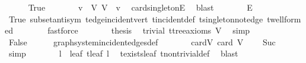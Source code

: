 \begin{isabellebody}
\ \ \ \ \isamarkupfalse%
\ True\isanewline
\ \ \ \ \isamarkupfalse%
\ \isamarkupfalse%
\ v\ \ V{\isacharcolon}{\kern0pt}\ {\isachardoublequoteopen}V\ {\isacharequal}{\kern0pt}\ {\isacharbraceleft}{\kern0pt}v{\isacharbraceright}{\kern0pt}{\isachardoublequoteclose}\ \isamarkupfalse%
\ card{\isacharunderscore}{\kern0pt}{}{\isacharunderscore}{\kern0pt}singletonE\ \isamarkupfalse%
\ blast\isanewline
\ \ \ \ \isamarkupfalse%
\ \isamarkupfalse%
\ {\isachardoublequoteopen}E\ {\isacharequal}{\kern0pt}\ {\isacharbraceleft}{\kern0pt}{\isacharbraceright}{\kern0pt}{\isachardoublequoteclose}\isanewline
\ \ \ \ \ \ \isamarkupfalse%
\ True\ subset{\isacharunderscore}{\kern0pt}antisym\ t{\isachardot}{\kern0pt}edge{\isacharunderscore}{\kern0pt}incident{\isacharunderscore}{\kern0pt}vert\ t{\isachardot}{\kern0pt}incident{\isacharunderscore}{\kern0pt}def\ t{\isachardot}{\kern0pt}singleton{\isacharunderscore}{\kern0pt}not{\isacharunderscore}{\kern0pt}edge\ t{\isachardot}{\kern0pt}wellformed\isanewline
\ \ \ \ \ \ \isamarkupfalse%
\ fastforce\isanewline
\ \ \ \ \isamarkupfalse%
\ \isamarkupfalse%
\ {\isacharquery}{\kern0pt}thesis\ \isamarkupfalse%
\ trivial\ t{\isachardot}{\kern0pt}tree{\isacharunderscore}{\kern0pt}axioms\ V\ \isamarkupfalse%
\ simp\isanewline
\ \ \isamarkupfalse%
\isanewline
\ \ \ \ \isamarkupfalse%
\ False\isanewline
\ \ \ \ \isamarkupfalse%
\ graph{\isacharunderscore}{\kern0pt}system{\isachardot}{\kern0pt}incident{\isacharunderscore}{\kern0pt}edges{\isacharunderscore}{\kern0pt}def\isanewline
\ \ \ \ \isamarkupfalse%
\ \isamarkupfalse%
\ card{\isacharunderscore}{\kern0pt}V{\isacharcolon}{\kern0pt}\ {\isachardoublequoteopen}card\ V\ {\isasymge}\ {}{\isachardoublequoteclose}\ \isamarkupfalse%
\ Suc\ \isamarkupfalse%
\ simp\isanewline
\ \ \ \ \isamarkupfalse%
\ \isamarkupfalse%
\ l\ \ leaf{\isacharcolon}{\kern0pt}\ {\isachardoublequoteopen}t{\isachardot}{\kern0pt}leaf\ l{\isachardoublequoteclose}\ \isamarkupfalse%
\ t{\isachardot}{\kern0pt}exists{\isacharunderscore}{\kern0pt}leaf\ t{\isachardot}{\kern0pt}non{\isacharunderscore}{\kern0pt}trivial{\isacharunderscore}{\kern0pt}def\ \isamarkupfalse%
\ blast\isanewline

\end{isabellebody}
